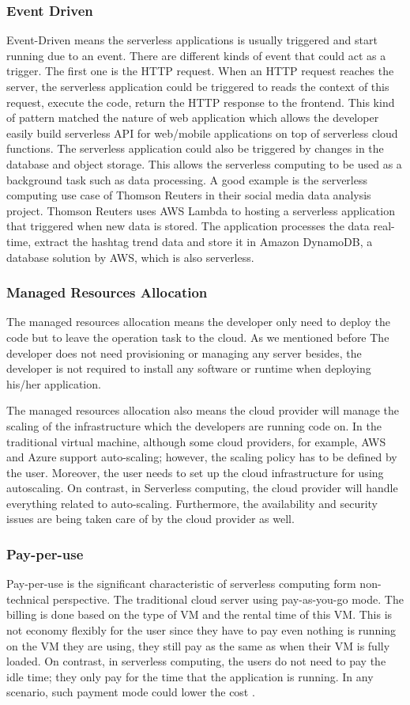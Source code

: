 \subsubsection{Event Driven}
Event-Driven means the serverless applications is usually triggered and start running due to an event. There are different kinds of event that could act as a trigger. The first one is the HTTP request. When an HTTP request reaches the server, the serverless application could be triggered to reads the context of this request, execute the code, return the HTTP response to the frontend. This kind of pattern matched the nature of web application which allows the developer easily build serverless API for web/mobile applications on top of serverless cloud functions. The serverless application could also be triggered by changes in the database and object storage. This allows the serverless computing to be used as a background task such as data processing. A good example is the serverless computing use case of Thomson Reuters in their social media data analysis project\cite{ThomsonR38:online}. Thomson Reuters uses AWS Lambda to hosting a serverless application that triggered when new data is stored. The application processes the data real-time, extract the hashtag trend data and store it in Amazon DynamoDB, a database solution by AWS, which is also serverless.
\subsubsection{Managed Resources Allocation}
The managed resources allocation means the developer only need to deploy the code but to leave the operation task to the cloud. As we mentioned before The developer does not need provisioning or managing any server besides, the developer is not required to install any software or runtime \cite{Serverle64:online} when deploying his/her application. 
\par
The managed resources allocation also means the cloud provider will manage the scaling of the infrastructure which the developers are running code on. In the traditional virtual machine, although some cloud providers, for example, AWS and Azure support auto-scaling; however, the scaling policy has to be defined by the user. Moreover, the user needs to set up the cloud infrastructure for using autoscaling. On contrast, in Serverless computing, the cloud provider will handle everything related to auto-scaling.
Furthermore, the availability and security issues are being taken care of by the cloud provider as well. 
\subsubsection{Pay-per-use}
Pay-per-use is the significant characteristic of serverless computing form non-technical perspective. The traditional cloud server using pay-as-you-go mode. The billing is done based on the type of VM and the rental time of this VM. This is not economy flexibly for the user since they have to pay even nothing is running on the VM they are using, they still pay as the same as when their VM is fully loaded. On contrast, in serverless computing, the users do not need to pay the idle time; they only pay for the time that the application is running. In any scenario, such payment mode could lower the cost \cite{jonas2019cloud}.
